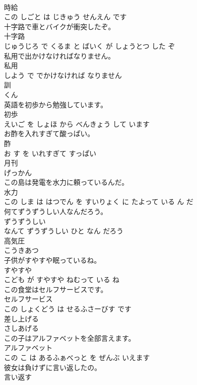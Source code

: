 \documentclass[8pt]{extreport}
\begin{document}
\begin{CJK}{UTF8}{min}
\\	時給 
\\	この しごと は じきゅう せんえん です			
\\	十字路で車とバイクが衝突したぞ。	
\\	十字路 
\\	じゅうじろ で くるま と ばいく が しょうとつ した ぞ			
\\	私用で出かけなければなりません。	
\\	私用 
\\	しよう で でかけなければ なりません			
\\	訓	
\\	くん		
\\	英語を初歩から勉強しています。	
\\	初歩 
\\	えいご を しょほ から べんきょう して います			
\\	お酢を入れすぎて酸っぱい。	
\\	酢 
\\	お す を いれすぎて すっぱい			
\\	月刊	
\\	げっかん		
\\	この島は発電を水力に頼っているんだ。	
\\	水力 
\\	この しま は はつでん を すいりょく に たよって いる ん だ			
\\	何てずうずうしい人なんだろう。	
\\	ずうずうしい 
\\	なんて ずうずうしい ひと なん だろう			
\\	高気圧	
\\	こうきあつ		
\\	子供がすやすや眠っているね。	
\\	すやすや 
\\	こども が すやすや ねむって いる ね			
\\	この食堂はセルフサービスです。	
\\	セルフサービス 
\\	この しょくどう は せるふさーびす です			
\\	差し上げる	
\\	さしあげる		
\\	この子はアルファベットを全部言えます。	
\\	アルファベット 
\\	この こ は あるふぁべっと を ぜんぶ いえます			
\\	彼女は負けずに言い返したの。	
\\	言い返す 

\end{CJK}
\end{document}
